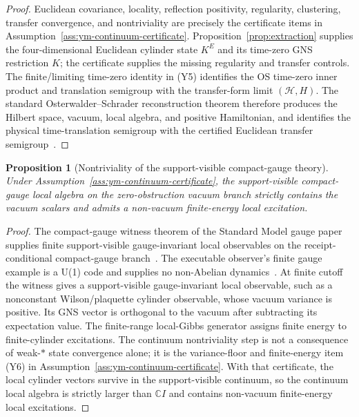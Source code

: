\documentclass[11pt]{article}
\numberwithin{equation}{section}
\newtheorem{proposition}[theorem]{Proposition}
\theoremstyle{remark}
\newcommand{\Hcal}{\mathcal H}
\newcommand{\C}{\mathbb C}
\begin{document}
\begin{proof}
Euclidean covariance, locality, reflection positivity, regularity, clustering, transfer
convergence, and nontriviality are precisely the certificate items in
Assumption~\ref{ass:ym-continuum-certificate}. Proposition~\ref{prop:extraction} supplies the
four-dimensional Euclidean cylinder state \(K^E\) and its time-zero GNS restriction \(K\); the
certificate supplies the missing regularity and transfer controls. The finite/limiting time-zero
identity in (Y5) identifies the OS time-zero inner product and translation semigroup with the
transfer-form limit \((\Hcal,H)\). The standard Osterwalder--Schrader reconstruction theorem
therefore produces the Hilbert space, vacuum, local algebra, and positive Hamiltonian, and
identifies the physical time-translation semigroup with the certified Euclidean transfer
semigroup~\cite{osterwalder-schrader1,osterwalder-schrader2}.
\end{proof}

\begin{proposition}[Nontriviality of the support-visible compact-gauge theory]
\label{prop:nontriviality}
Under Assumption~\ref{ass:ym-continuum-certificate},
the support-visible compact-gauge local algebra on the zero-obstruction vacuum branch strictly
contains the vacuum scalars and admits a non-vacuum finite-energy local excitation.
\end{proposition}

\begin{proof}
The compact-gauge witness theorem of the Standard Model gauge paper supplies finite
support-visible gauge-invariant local observables on the receipt-conditional compact-gauge
branch~\cite{oph2}. The executable observer's finite gauge example is a U(1) code and supplies no
non-Abelian dynamics~\cite{ophpremises}. At finite cutoff the witness gives a
support-visible gauge-invariant local observable, such as a nonconstant Wilson/plaquette cylinder
observable, whose vacuum variance is positive. Its GNS vector is orthogonal to the vacuum after
subtracting its expectation value. The finite-range local-Gibbs generator assigns finite energy to
finite-cylinder excitations. The continuum nontriviality step is not a consequence of weak-\(*\)
state convergence alone; it is the variance-floor and finite-energy item (Y6) in
Assumption~\ref{ass:ym-continuum-certificate}. With that certificate, the local cylinder vectors
survive in the support-visible continuum, so the continuum local algebra is strictly larger than
\(\C I\) and contains non-vacuum finite-energy local excitations.
\end{proof}
\end{document}
